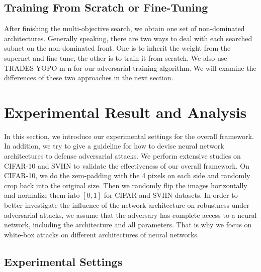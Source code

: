 \documentclass[journal]{IEEEtran}
\begin{document}
\subsection{\textbf{Training From Scratch or Fine-Tuning}}
After finishing the multi-objective search, we obtain one set of non-dominated architectures. Generally speaking, there are two ways to deal with each searched subnet on the non-dominated front. One is to inherit the weight from the supernet and fine-tune, the other is to train it from scratch. We also use TRADES-YOPO-m-n for our adversarial training algorithm. We will examine the differences of these two approaches in the next section.




\section{Experimental Result and Analysis}
In this section, we introduce our experimental settings for the overall framework. In addition, we try to give a guideline for how to devise neural network architectures to defense adversarial attacks.  We perform extensive studies on CIFAR-10 \cite{krizhevsky2009learning} and SVHN \cite{netzer2011reading} to validate the effectiveness of our overall framework. On CIFAR-10, we do the zero-padding with the 4 pixels on each side and randomly crop back into the original size. Then we randomly flip the images horizontally and normalize them into $\left [0,1  \right ]$ for CIFAR and SVHN datasets. In order to better investigate the influence of the network architecture on robustness under adversarial attacks, we assume that the adversary has complete access to a neural network, including the architecture and all parameters. That is why we focus on white-box attacks on different architectures of neural networks.


\subsection{\textbf{Experimental Settings}}
\end{document}
